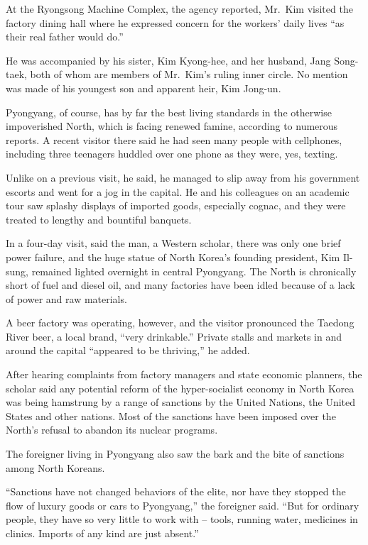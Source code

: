 ﻿\documentclass[12pt]{article}
\begin{document}
At the Ryongsong Machine Complex, the agency reported, Mr.~Kim visited the factory dining hall where
he expressed concern for the workers' daily lives ``as their real father would do.''

He was accompanied by his sister, Kim Kyong-hee, and her husband, Jang Song-taek, both of whom are
members of Mr.~Kim's ruling inner circle. No mention was made of his youngest son and apparent heir,
Kim Jong-un.

Pyongyang, of course, has by far the best living standards in the otherwise impoverished North,
which is facing renewed famine, according to numerous reports. A recent visitor there said he had
seen many people with cellphones, including three teenagers huddled over one phone as they were,
yes, texting.

Unlike on a previous visit, he said, he managed to slip away from his government escorts and went
for a jog in the capital. He and his colleagues on an academic tour saw splashy displays of imported
goods, especially cognac, and they were treated to lengthy and bountiful banquets.

In a four-day visit, said the man, a Western scholar, there was only one brief power failure, and
the huge statue of North Korea's founding president, Kim Il-sung, remained lighted overnight in
central Pyongyang. The North is chronically short of fuel and diesel oil, and many factories have
been idled because of a lack of power and raw materials.

A beer factory was operating, however, and the visitor pronounced the Taedong River beer, a local
brand, ``very drinkable.'' Private stalls and markets in and around the capital ``appeared to be
thriving,'' he added.

After hearing complaints from factory managers and state economic planners, the scholar said any
potential reform of the hyper-socialist economy in North Korea was being hamstrung by a range of
sanctions by the United Nations, the United States and other nations. Most of the sanctions have
been imposed over the North's refusal to abandon its nuclear programs.

The foreigner living in Pyongyang also saw the bark and the bite of sanctions among North Koreans.

``Sanctions have not changed behaviors of the elite, nor have they stopped the flow of luxury goods
or cars to Pyongyang,'' the foreigner said. ``But for ordinary people, they have so very little to
work with -- tools, running water, medicines in clinics. Imports of any kind are just absent.''
\end{document}
